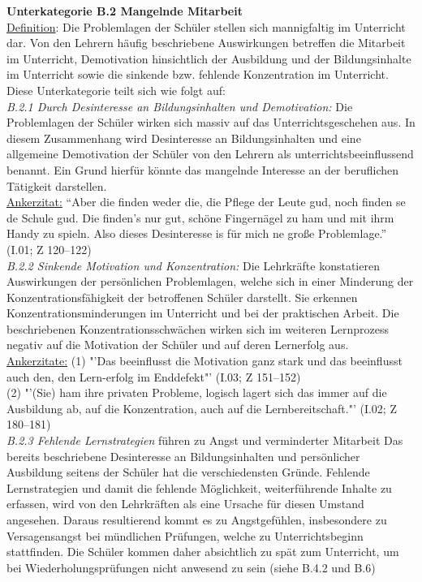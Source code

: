 \noindent
\textbf{Unterkategorie B.2 Mangelnde Mitarbeit}\\
\underline{Definition}: Die Problemlagen der Schüler stellen sich mannigfaltig im Unterricht dar. Von den Lehrern häufig beschriebene Auswirkungen betreffen die Mitarbeit im Unterricht, Demotivation hinsichtlich der Ausbildung und der Bildungsinhalte im Unterricht sowie die sinkende bzw. fehlende Konzentration im Unterricht. Diese Unterkategorie teilt sich wie folgt auf:\\
\textit{B.2.1 Durch Desinteresse an Bildungsinhalten und Demotivation:} Die Problemlagen der Schüler wirken sich massiv auf das Unterrichtsgeschehen aus. In diesem Zusammenhang wird Desinteresse an Bildungsinhalten und eine allgemeine Demotivation der Schüler von den Lehrern als unterrichtsbeeinflussend benannt. Ein Grund hierfür könnte das mangelnde Interesse an der beruflichen Tätigkeit darstellen.\\
\underline{Ankerzitat:} "`Aber die finden weder die, die Pflege der Leute gud, noch finden se de Schule gud. Die finden's nur gut, schöne Fingernägel zu ham und mit ihrm Handy zu spieln. Also dieses Desinteresse is für mich ne große Problemlage."' (I.01; Z 120--122)\\
\textit{B.2.2  Sinkende Motivation und Konzentration:} Die Lehrkräfte konstatieren Auswirkungen der persönlichen Problemlagen, welche sich in einer Minderung der Konzentrationsfähigkeit der betroffenen Schüler darstellt. Sie erkennen Konzentrationsminderungen im Unterricht und bei der praktischen Arbeit. Die beschriebenen Konzentrationsschwächen wirken sich im weiteren Lernprozess negativ auf die Motivation der Schüler und auf deren Lernerfolg aus.\\
\underline{Ankerzitate:} (1) "'Das beeinflusst die Motivation ganz stark und das beeinflusst auch den, den Lern-erfolg im Enddefekt"' (I.03; Z 151--152)\\ (2) "'(Sie) ham ihre privaten Probleme, logisch lagert sich das immer auf die Ausbildung ab, auf die Konzentration, auch auf die Lernbereitschaft."' (I.02; Z 180--181)\\
\textit{B.2.3 Fehlende Lernstrategien} führen zu Angst und verminderter Mitarbeit Das bereits beschriebene Desinteresse an Bildungsinhalten und persönlicher Ausbildung seitens der Schüler hat die verschiedensten Gründe. Fehlende Lernstrategien und damit die fehlende Möglichkeit, weiterführende Inhalte zu erfassen, wird von den Lehrkräften als eine Ursache für diesen Umstand angesehen. Daraus resultierend kommt es zu Angstgefühlen, insbesondere zu Versagensangst bei mündlichen Prüfungen, welche zu Unterrichtsbeginn stattfinden. Die Schüler kommen daher absichtlich zu spät zum Unterricht, um bei Wiederholungsprüfungen nicht anwesend zu sein (siehe B.4.2 und B.6)\\
